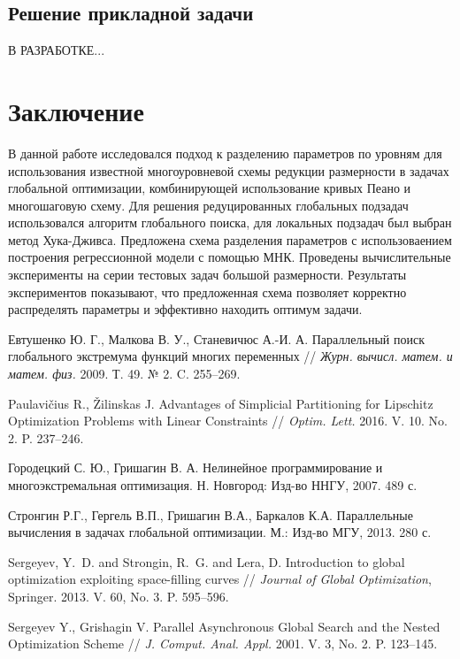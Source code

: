 \documentclass[11pt, oneside, a4paper]{article}
\begin{document}
\subsection{Решение прикладной задачи}

В РАЗРАБОТКЕ...

\section{Заключение}

В данной работе исследовался подход к разделению параметров по уровням для использования известной многоуровневой схемы редукции размерности в задачах глобальной оптимизации, комбинирующей использование кривых Пеано и многошаговую схему. Для решения редуцированных глобальных подзадач использовался алгоритм глобального поиска, для локальных подзадач был выбран метод Хука-Дживса. Предложена схема разделения параметров с использоваением построения регрессионной модели с помощью МНК. Проведены вычислительные эксперименты на серии тестовых задач большой размерности. Результаты экспериментов показывают, что предложенная схема позволяет корректно распределять параметры и эффективно находить оптимум задачи.

\begin{biblio}

 Евтушенко Ю. Г., Малкова В. У., Станевичюс А.-И. А. Параллельный поиск глобального экстремума функций многих переменных // {\it Журн. вычисл. матем. и матем. физ.} 2009. Т. 49. № 2. C. 255--269.

 Paulavi{\v c}ius R., {\v Z}ilinskas J. Advantages of Simplicial Partitioning for Lipschitz Optimization Problems with Linear Constraints // {\it Optim. Lett.} 2016. V. 10. No. 2. P. 237--246.

 Городецкий С. Ю., Гришагин В. А. Нелинейное программирование и многоэкстремальная оптимизация. Н. Новгород: Изд-во ННГУ, 2007. 489 с.

 Стронгин Р.Г., Гергель В.П., Гришагин В.А., Баркалов К.А. Параллельные вычисления в задачах глобальной оптимизации. М.: Изд-во МГУ, 2013. 280 с.

 Sergeyev, Y.~D. and Strongin, R.~G. and Lera, D. Introduction to global optimization exploiting space-filling curves // {\it Journal of Global Optimization}, Springer. 2013. V. 60, No. 3. P. 595--596.

 Sergeyev Y., Grishagin V. Parallel Asynchronous Global Search and the Nested Optimization Scheme //  {\it J. Comput. Anal. Appl.} 2001. V. 3, No. 2. P. 123--145.



\end{biblio}
\end{document}
